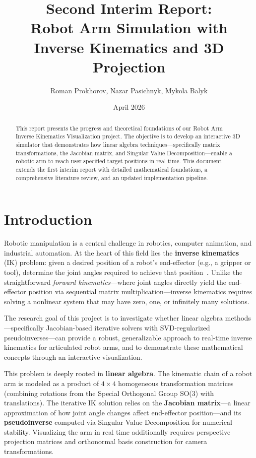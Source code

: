 \documentclass[11pt]{article}
\title{\textbf{Second Interim Report:}\\Robot Arm Simulation with Inverse Kinematics and 3D Projection}
\author{Roman Prokhorov, Nazar Pasichnyk, Mykola Balyk}
\date{April 2026}
\begin{document}
\maketitle

\begin{abstract}
This report presents the progress and theoretical foundations of our Robot Arm Inverse Kinematics Visualization project. The objective is to develop an interactive 3D simulator that demonstrates how linear algebra techniques---specifically matrix transformations, the Jacobian matrix, and Singular Value Decomposition---enable a robotic arm to reach user-specified target positions in real time. This document extends the first interim report with detailed mathematical foundations, a comprehensive literature review, and an updated implementation pipeline.
\end{abstract}

\section{Introduction}

Robotic manipulation is a central challenge in robotics, computer animation, and industrial automation. At the heart of this field lies the \textbf{inverse kinematics} (IK) problem: given a desired position of a robot's end-effector (e.g., a gripper or tool), determine the joint angles required to achieve that position~\cite{buss2004}. Unlike the straightforward \textit{forward kinematics}---where joint angles directly yield the end-effector position via sequential matrix multiplication---inverse kinematics requires solving a nonlinear system that may have zero, one, or infinitely many solutions.

The research goal of this project is to investigate whether linear algebra methods---specifically Jacobian-based iterative solvers with SVD-regularized pseudoinverses---can provide a robust, generalizable approach to real-time inverse kinematics for articulated robot arms, and to demonstrate these mathematical concepts through an interactive visualization.

This problem is deeply rooted in \textbf{linear algebra}. The kinematic chain of a robot arm is modeled as a product of $4 \times 4$ homogeneous transformation matrices (combining rotations from the Special Orthogonal Group SO(3) with translations). The iterative IK solution relies on the \textbf{Jacobian matrix}---a linear approximation of how joint angle changes affect end-effector position---and its \textbf{pseudoinverse} computed via Singular Value Decomposition for numerical stability. Visualizing the arm in real time additionally requires perspective projection matrices and orthonormal basis construction for camera transformations.
\end{document}
